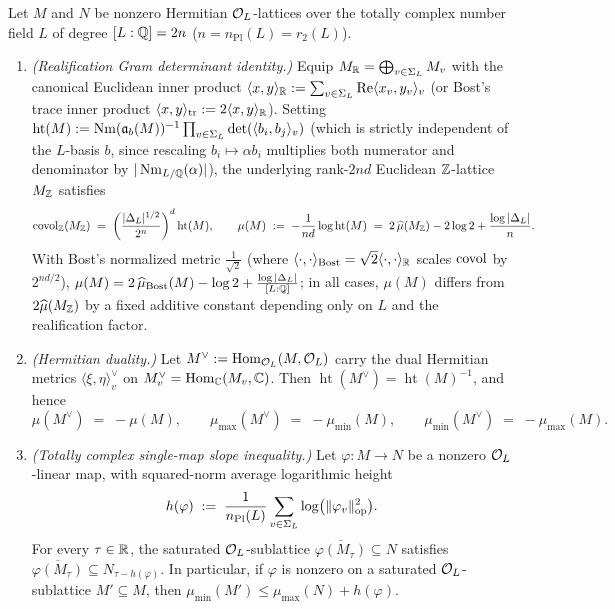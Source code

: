\begin{proposition}
\label{prop:05:herm-properties}
Let $M$ and $N$ be nonzero Hermitian $\mathcal{O}_L$-lattices over the totally complex number field $L$ of degree $[L:\mathbb{Q}] = 2n$ ($n = n_{\mathrm{Pl}}(L) = r_2(L)$).
\begin{enumerate}[label=\textup{(\roman*)}]
\item \emph{(Realification Gram determinant identity.)} Equip $M_{\mathbb{R}} = \bigoplus_{v \in \Sigma_L} M_v$ with the canonical Euclidean inner product $\langle x, y \rangle_{\mathbb{R}} := \sum_{v \in \Sigma_L} \operatorname{Re}\langle x_v, y_v \rangle_v$ (or Bost's trace inner product $\langle x, y \rangle_{\mathrm{tr}} := 2\langle x, y \rangle_{\mathbb{R}}$). Setting $\operatorname{ht}(M) := \operatorname{Nm}(\mathfrak{a}_b(M))^{-1} \prod_{v \in \Sigma_L} \det(\langle b_i, b_j \rangle_v)$ (which is strictly independent of the $L$-basis $b$, since rescaling $b_i \mapsto \alpha b_i$ multiplies both numerator and denominator by $|\operatorname{Nm}_{L/\mathbb{Q}}(\alpha)|$), the underlying rank-$2nd$ Euclidean $\mathbb{Z}$-lattice $M_{\mathbb{Z}}$ satisfies
  \begin{equation}
  \label{eq:05:realif-gram}
    \operatorname{covol}_{\mathbb{Z}}(M_{\mathbb{Z}}) \;=\; \left(\frac{|\Delta_L|^{1/2}}{2^n}\right)^d \operatorname{ht}(M),
    \qquad
    \mu(M) \;:=\; -\frac{1}{n d}\log\operatorname{ht}(M) \;=\; 2\,\widehat{\mu}(M_{\mathbb{Z}}) - 2\log 2 + \frac{\log|\Delta_L|}{n}.
  \end{equation}
  With Bost's normalized metric $\frac{1}{\sqrt{2}}$ (where $\langle \cdot, \cdot \rangle_{\mathrm{Bost}} = \sqrt{2}\langle \cdot, \cdot \rangle_{\mathbb{R}}$ scales $\operatorname{covol}$ by $2^{nd/2}$), $\mu(M) = 2\,\widehat{\mu}_{\mathrm{Bost}}(M) - \log 2 + \frac{\log|\Delta_L|}{[L:\mathbb{Q}]}$; in all cases, $\mu(M)$ differs from $2\widehat{\mu}(M_{\mathbb{Z}})$ by a fixed additive constant depending only on $L$ and the realification factor.
\item \emph{(Hermitian duality.)} Let $M^\vee := \mathrm{Hom}_{\mathcal{O}_L}(M, \mathcal{O}_L)$ carry the dual Hermitian metrics $\langle \xi, \eta \rangle_v^\vee$ on $M_v^\vee = \mathrm{Hom}_{\mathbb{C}}(M_v, \mathbb{C})$. Then $\operatorname{ht}(M^\vee) = \operatorname{ht}(M)^{-1}$, and hence
  \begin{equation}
  \label{eq:05:duality}
    \mu(M^\vee) \;=\; -\mu(M), \qquad \mu_{\max}(M^\vee) \;=\; -\mu_{\min}(M), \qquad \mu_{\min}(M^\vee) \;=\; -\mu_{\max}(M).
  \end{equation}
\item \emph{(Totally complex single-map slope inequality.)} Let $\varphi : M \to N$ be a nonzero $\mathcal{O}_L$-linear map, with squared-norm average logarithmic height
  \begin{equation}
  \label{eq:05:map-height}
    h(\varphi) \;:=\; \frac{1}{n_{\mathrm{Pl}}(L)} \sum_{v \in \Sigma_L} \log\bigl(\|\varphi_v\|_{\mathrm{op}}^2\bigr).
  \end{equation}
  For every $\tau \in \mathbb{R}$, the saturated $\mathcal{O}_L$-sublattice $\overline{\varphi(M_\tau)} \subseteq N$ satisfies $\overline{\varphi(M_\tau)} \subseteq N_{\tau - h(\varphi)}$. In particular, if $\varphi$ is nonzero on a saturated $\mathcal{O}_L$-sublattice $M' \subseteq M$, then $\mu_{\min}(M') \le \mu_{\max}(N) + h(\varphi)$.
\end{enumerate}
\end{proposition}
